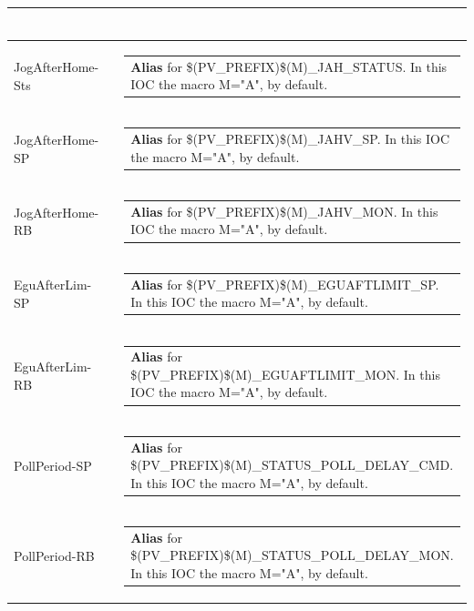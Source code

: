 \documentclass[openany]{article}
\begin{document}
\begin{longtable}{| m{4.5cm} m{2.5cm}  m{8.5cm} |}
\begin{tabular}{@{}m{6cm}@{}}
            \end{tabular} \hypertarget{}{}\\ \hline
        JogAfterHome-Sts &  & \begin{tabular}{@{}m{6cm}@{}}
                \textbf{\color{blue} Alias} for \$(PV\_PREFIX)\$(M)\_JAH\_STATUS. In this IOC the macro M="A", by default.
            \end{tabular} \hypertarget{pv:jog-after-home-sp}{}\\ \hline
        JogAfterHome-SP &  & \begin{tabular}{@{}m{6cm}@{}}
                \textbf{\color{blue} Alias} for \$(PV\_PREFIX)\$(M)\_JAHV\_SP. In this IOC the macro M="A", by default.
            \end{tabular} \hypertarget{}{}\\ \hline
        JogAfterHome-RB &  & \begin{tabular}{@{}m{6cm}@{}}
                \textbf{\color{blue} Alias} for \$(PV\_PREFIX)\$(M)\_JAHV\_MON. In this IOC the macro M="A", by default.
            \end{tabular} \hypertarget{pv:egu-after-lim}{}\\ \hline
        EguAfterLim-SP &  & \begin{tabular}{@{}m{6cm}@{}}
                \textbf{\color{blue} Alias} for \$(PV\_PREFIX)\$(M)\_EGUAFTLIMIT\_SP. In this IOC the macro M="A", by default.
            \end{tabular} \hypertarget{}{}\\ \hline
        EguAfterLim-RB &  & \begin{tabular}{@{}m{6cm}@{}}
                \textbf{\color{blue} Alias} for \$(PV\_PREFIX)\$(M)\_EGUAFTLIMIT\_MON. In this IOC the macro M="A", by default.
            \end{tabular} \hypertarget{pv:poll-period}{}\\ \hline
        PollPeriod-SP &  & \begin{tabular}{@{}m{6cm}@{}}
                \textbf{\color{blue} Alias} for \$(PV\_PREFIX)\$(M)\_STATUS\_POLL\_DELAY\_CMD. In this IOC the macro M="A", by default.
            \end{tabular} \hypertarget{}{}\\ \hline
        PollPeriod-RB &  & \begin{tabular}{@{}m{6cm}@{}}
                \textbf{\color{blue} Alias} for \$(PV\_PREFIX)\$(M)\_STATUS\_POLL\_DELAY\_MON. In this IOC the macro M="A", by default.

\end{tabular}
\end{longtable}
\end{document}
